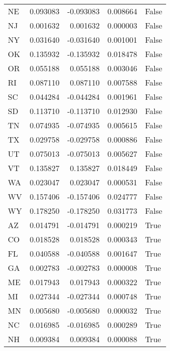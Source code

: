 \begin{table}
\begin{tabular}{lrrrl}
      NE &   0.093083 & -0.093083 &       0.008664 &         False \\
      NJ &   0.001632 &  0.001632 &       0.000003 &         False \\
      NY &   0.031640 & -0.031640 &       0.001001 &         False \\
      OK &   0.135932 & -0.135932 &       0.018478 &         False \\
      OR &   0.055188 &  0.055188 &       0.003046 &         False \\
      RI &   0.087110 &  0.087110 &       0.007588 &         False \\
      SC &   0.044284 & -0.044284 &       0.001961 &         False \\
      SD &   0.113710 & -0.113710 &       0.012930 &         False \\
      TN &   0.074935 & -0.074935 &       0.005615 &         False \\
      TX &   0.029758 & -0.029758 &       0.000886 &         False \\
      UT &   0.075013 & -0.075013 &       0.005627 &         False \\
      VT &   0.135827 &  0.135827 &       0.018449 &         False \\
      WA &   0.023047 &  0.023047 &       0.000531 &         False \\
      WV &   0.157406 & -0.157406 &       0.024777 &         False \\
      WY &   0.178250 & -0.178250 &       0.031773 &         False \\
      AZ &   0.014791 & -0.014791 &       0.000219 &          True \\
      CO &   0.018528 &  0.018528 &       0.000343 &          True \\
      FL &   0.040588 & -0.040588 &       0.001647 &          True \\
      GA &   0.002783 & -0.002783 &       0.000008 &          True \\
      ME &   0.017943 &  0.017943 &       0.000322 &          True \\
      MI &   0.027344 & -0.027344 &       0.000748 &          True \\
      MN &   0.005680 & -0.005680 &       0.000032 &          True \\
      NC &   0.016985 & -0.016985 &       0.000289 &          True \\
      NH &   0.009384 &  0.009384 &       0.000088 &          True \\

\end{tabular}
\end{table}
